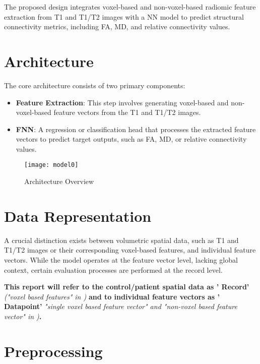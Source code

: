 The proposed design integrates voxel-based and non-voxel-based radiomic feature extraction from T1 and T1/T2 images with a \ac{NN} model to predict structural connectivity metrics, including \ac{FA}, \ac{MD}, and relative connectivity values.

\section{Architecture}

The core architecture consists of two primary components:
\begin{itemize}
\item \textbf{Feature Extraction}: This step involves generating voxel-based and non-voxel-based feature vectors from the T1 and T1/T2 images.
\item \textbf{\ac{FNN}}: A regression or classification head that processes the extracted feature vectors to predict target outputs, such as \ac{FA}, \ac{MD}, or relative connectivity values.
\end{itemize}

\begin{figure}[H]
\centering
\texttt{[image: model0]}
\caption{Architecture Overview}
\label{fig:model0}
\end{figure}

\section{Data Representation}

A crucial distinction exists between volumetric spatial data, such as T1 and T1/T2 images or their corresponding voxel-based features, and individual feature vectors. While the model operates at the feature vector level, lacking global context, certain evaluation processes are performed at the record level.\par
\textbf{This report will refer to the control/patient spatial data as '{\color{red} Record}'} \emph{("voxel based features" in )} \textbf{and to individual feature vectors as '{\color{red} Datapoint}'} \emph{"single voxel based feature vector" and "non-voxel based feature vector" in )}\textbf{.}

\section{Preprocessing}
\label{sec:preproc}

